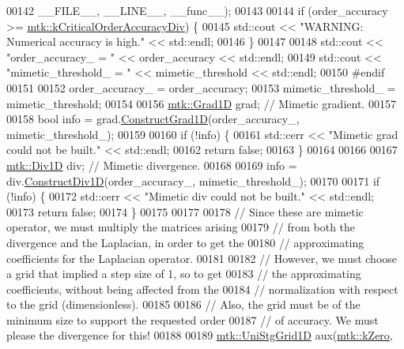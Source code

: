 \begin{DoxyCode}
00142                       \_\_FILE\_\_, \_\_LINE\_\_, \_\_func\_\_);
00143 
00144   \textcolor{keywordflow}{if} (order\_accuracy >= \hyperlink{group__c01-roots_ga0898eef2108473e44a5223932d571c31}{mtk::kCriticalOrderAccuracyDiv}) \{
00145     std::cout << \textcolor{stringliteral}{"WARNING: Numerical accuracy is high."} << std::endl;
00146   \}
00147 
00148   std::cout << \textcolor{stringliteral}{"order\_accuracy\_ = "} << order\_accuracy << std::endl;
00149   std::cout << \textcolor{stringliteral}{"mimetic\_threshold\_ = "} << mimetic\_threshold << std::endl;
00150 \textcolor{preprocessor}{  #endif}
00151 
00152   order\_accuracy\_ = order\_accuracy;
00153   mimetic\_threshold\_ = mimetic\_threshold;
00154 
00156   \hyperlink{classmtk_1_1Grad1D}{mtk::Grad1D} grad; \textcolor{comment}{// Mimetic gradient.}
00157 
00158   \textcolor{keywordtype}{bool} info = grad.\hyperlink{classmtk_1_1Grad1D_a74ef5245cfae6fd158bd7f563a0c2e52}{ConstructGrad1D}(order\_accuracy\_, mimetic\_threshold\_);
00159 
00160   \textcolor{keywordflow}{if} (!info) \{
00161     std::cerr << \textcolor{stringliteral}{"Mimetic grad could not be built."} << std::endl;
00162     \textcolor{keywordflow}{return} \textcolor{keyword}{false};
00163   \}
00164 
00166 
00167   \hyperlink{classmtk_1_1Div1D}{mtk::Div1D} div; \textcolor{comment}{// Mimetic divergence.}
00168 
00169   info = div.\hyperlink{classmtk_1_1Div1D_a52fcd1542f11e606e36bd188e48bfdf7}{ConstructDiv1D}(order\_accuracy\_, mimetic\_threshold\_);
00170 
00171   \textcolor{keywordflow}{if} (!info) \{
00172     std::cerr << \textcolor{stringliteral}{"Mimetic div could not be built."} << std::endl;
00173     \textcolor{keywordflow}{return} \textcolor{keyword}{false};
00174   \}
00175 
00177 
00178   \textcolor{comment}{// Since these are mimetic operator, we must multiply the matrices arising}
00179   \textcolor{comment}{// from both the divergence and the Laplacian, in order to get the}
00180   \textcolor{comment}{// approximating coefficients for the Laplacian operator.}
00181 
00182   \textcolor{comment}{// However, we must choose a grid that implied a step size of 1, so to get}
00183   \textcolor{comment}{// the approximating coefficients, without being affected from the}
00184   \textcolor{comment}{// normalization with respect to the grid (dimensionless).}
00185 
00186   \textcolor{comment}{// Also, the grid must be of the minimum size to support the requested order}
00187   \textcolor{comment}{// of accuracy. We must please the divergence for this!}
00188 
00189   \hyperlink{classmtk_1_1UniStgGrid1D}{mtk::UniStgGrid1D} aux(\hyperlink{group__c01-roots_ga59a451a5fae30d59649bcda274fea271}{mtk::kZero},

\end{DoxyCode}
